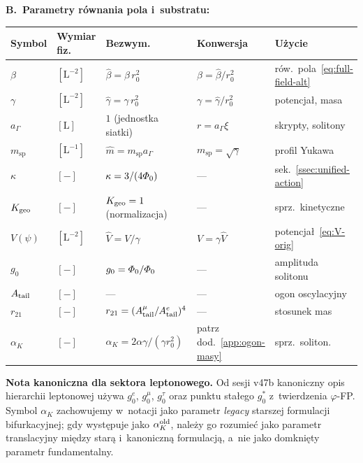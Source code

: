 \medskip\noindent
\textbf{B.~Parametry r\'ownania pola i~substratu:}

\begin{center}
\begin{tabular}{@{}lllll@{}}
\toprule
\textbf{Symbol} & \textbf{Wymiar fiz.} & \textbf{Bezwym.} & \textbf{Konwersja} & \textbf{U\.zycie} \\
\midrule
$\beta$ & $[\mathrm{L}^{-2}]$ & $\hat\beta = \beta\,r_0^2$ & $\beta = \hat\beta/r_0^2$ & r\'ow.~pola~\eqref{eq:full-field-alt} \\
$\gamma$ & $[\mathrm{L}^{-2}]$ & $\hat\gamma = \gamma\,r_0^2$ & $\gamma = \hat\gamma/r_0^2$ & potencja\l{}, masa \\
$a_\Gamma$ & $[\mathrm{L}]$ & $1$ (jednostka siatki) & $r = a_\Gamma \xi$ & skrypty, solitony \\
$m_{\mathrm{sp}}$ & $[\mathrm{L}^{-1}]$ & $\hat m = m_{\mathrm{sp}} a_\Gamma$ & $m_{\mathrm{sp}} = \sqrt{\gamma}$ & profil Yukawa \\
$\kappa$ & $[-]$ & $\kappa = 3/(4\varPhi_0)$ & --- & sek.~\ref{ssec:unified-action} \\
$K_{\rm geo}$ & $[-]$ & $K_{\rm geo} = 1$ (normalizacja) & --- & sprz.~kinetyczne \\
$V(\psi)$ & $[\mathrm{L}^{-2}]$ & $\hat V = V/\gamma$ & $V = \gamma\hat V$ & potencja\l{}~\eqref{eq:V-orig} \\
$g_0$ & $[-]$ & $g_0 = \varPhi_0/\varPhi_0$ & --- & amplituda solitonu \\
$A_{\rm tail}$ & $[-]$ & --- & --- & ogon oscylacyjny \\
$r_{21}$ & $[-]$ & $r_{21} = (A_{\rm tail}^\mu/A_{\rm tail}^e)^4$ & --- & stosunek mas \\
$\alpha_K$ & $[-]$ & $\alpha_K = 2\alpha\gamma/(\gamma r_0^2)$ & patrz dod.~\ref{app:ogon-masy} & sprz.~soliton. \\
\bottomrule
\end{tabular}
\end{center}

\medskip\noindent
\textbf{Nota kanoniczna dla sektora leptonowego.}
Od sesji v47b kanoniczny opis hierarchii leptonowej u\.zywa
$g_0^e$, $g_0^\mu$, $g_0^\tau$ oraz punktu sta\l{}ego
$g_0^*$ z~twierdzenia $\varphi$-FP.
Symbol $\alpha_K$ zachowujemy w~notacji jako parametr
\emph{legacy} starszej formulacji bifurkacyjnej;
gdy wyst\k{e}puje jako $\alpha_K^{\rm old}$, nale\.zy go rozumie\'c
jako parametr translacyjny mi\k{e}dzy star\k{a} i~kanoniczn\k{a}
formulacj\k{a}, a~nie jako domkni\k{e}ty parametr fundamentalny.

